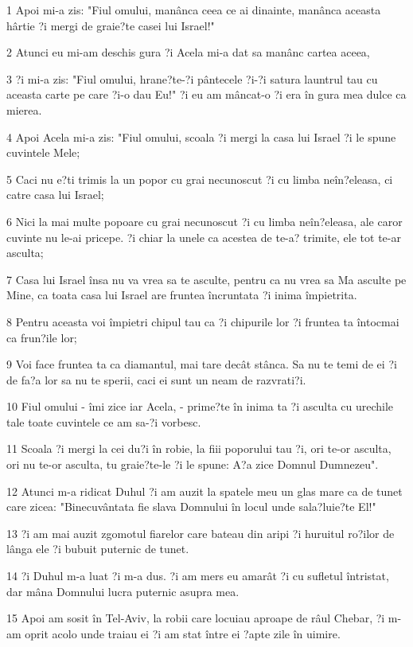 \par 1 Apoi mi-a zis: "Fiul omului, manânca ceea ce ai dinainte, manânca aceasta hârtie ?i mergi de graie?te casei lui Israel!"
\par 2 Atunci eu mi-am deschis gura ?i Acela mi-a dat sa manânc cartea aceea,
\par 3 ?i mi-a zis: "Fiul omului, hrane?te-?i pântecele ?i-?i satura launtrul tau cu aceasta carte pe care ?i-o dau Eu!" ?i eu am mâncat-o ?i era în gura mea dulce ca mierea.
\par 4 Apoi Acela mi-a zis: "Fiul omului, scoala ?i mergi la casa lui Israel ?i le spune cuvintele Mele;
\par 5 Caci nu e?ti trimis la un popor cu grai necunoscut ?i cu limba neîn?eleasa, ci catre casa lui Israel;
\par 6 Nici la mai multe popoare cu grai necunoscut ?i cu limba neîn?eleasa, ale caror cuvinte nu le-ai pricepe. ?i chiar la unele ca acestea de te-a? trimite, ele tot te-ar asculta;
\par 7 Casa lui Israel însa nu va vrea sa te asculte, pentru ca nu vrea sa Ma asculte pe Mine, ca toata casa lui Israel are fruntea încruntata ?i inima împietrita.
\par 8 Pentru aceasta voi împietri chipul tau ca ?i chipurile lor ?i fruntea ta întocmai ca frun?ile lor;
\par 9 Voi face fruntea ta ca diamantul, mai tare decât stânca. Sa nu te temi de ei ?i de fa?a lor sa nu te sperii, caci ei sunt un neam de razvrati?i.
\par 10 Fiul omului - îmi zice iar Acela, - prime?te în inima ta ?i asculta cu urechile tale toate cuvintele ce am sa-?i vorbesc.
\par 11 Scoala ?i mergi la cei du?i în robie, la fiii poporului tau ?i, ori te-or asculta, ori nu te-or asculta, tu graie?te-le ?i le spune: A?a zice Domnul Dumnezeu".
\par 12 Atunci m-a ridicat Duhul ?i am auzit la spatele meu un glas mare ca de tunet care zicea: "Binecuvântata fie slava Domnului în locul unde sala?luie?te El!"
\par 13 ?i am mai auzit zgomotul fiarelor care bateau din aripi ?i huruitul ro?ilor de lânga ele ?i bubuit puternic de tunet.
\par 14 ?i Duhul m-a luat ?i m-a dus. ?i am mers eu amarât ?i cu sufletul întristat, dar mâna Domnului lucra puternic asupra mea.
\par 15 Apoi am sosit în Tel-Aviv, la robii care locuiau aproape de râul Chebar, ?i m-am oprit acolo unde traiau ei ?i am stat între ei ?apte zile în uimire.
